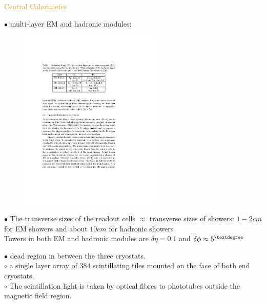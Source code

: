\begin{frame}{\textcolor{Goldenrod}{Central Calorimeter}}
\begin{overlayarea}{\textwidth}{\textheight}
  \item[$\bullet$] multi-layer EM and hadronic modules:\\
    \begin{figure}[h]\centering
      \includegraphics[height=0.2\textheight, width=0.6\textwidth]{./Images/39_CAL_layers.pdf}
    \end{figure}
  \item[$\bullet$]
    The transverse sizes of the readout cells $\approx$ transverse sizes
    of showers: $1-2 cm$ for EM showers and about $10 cm$ for hadronic showers\\
    Towers in both EM and hadronic modules are $\delta \eta = 0.1$ and
    $\delta \phi \approx 5^{\textdegree}$
    
    
    
  \item[$\bullet$] dead region in between the three cryostats.\\
    $\circ$ a single layer array of $384$ scintillating tiles mounted on the
    face of both end cryostats.\\
    $\circ$ The scintillation light is taken by optical fibres to
    phototubes outside the magnetic field region.
    
    \tti
  \end{overlayarea}
\end{frame}

